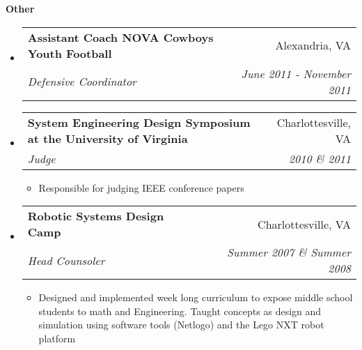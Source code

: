 \documentclass[letterpaper,10pt]{article}
\makeatletter
\newcommand{\resitem}[1]{\item #1 \vspace{-2pt}}
\newcommand{\resheading}[1]{{\large \colorbox{mygrey}{\begin{minipage}{\textwidth}{\textbf{#1 \vphantom{p\^{E}}}}\end{minipage}}}}
\newcommand{\ressubheading}[4]{
\begin{tabular*}{7.0in}{l@{\extracolsep{\fill}}r}
		\textbf{#1} & #2 \\
		\textit{#3} & \textit{#4} \\
\end{tabular*}\vspace{-6pt}}
\makeatother
\begin{document}
\resheading{Other}
 \begin{itemize}
\item
  \ressubheading{Assistant Coach NOVA Cowboys Youth Football}{Alexandria, VA}{Defensive Coordinator}{June 2011 - November 2011}
\item
  \ressubheading{System Engineering Design Symposium at the University of Virginia}{Charlottesville, VA}{Judge}{2010 \& 2011}
    \begin{itemize}
	\resitem{Responsible for judging IEEE conference papers}
    \end{itemize}   
    
\item
  \ressubheading{Robotic Systems Design Camp}{Charlottesville, VA}{Head Counsoler}{Summer 2007 \& Summer 2008}
	\begin{itemize}
		\resitem{Designed and implemented week long curriculum to expose middle school students to math and Engineering.  Taught concepts as design and simulation using software tools (Netlogo) and the Lego NXT robot platform}
	\end{itemize}

\end{itemize}
\end{document}
